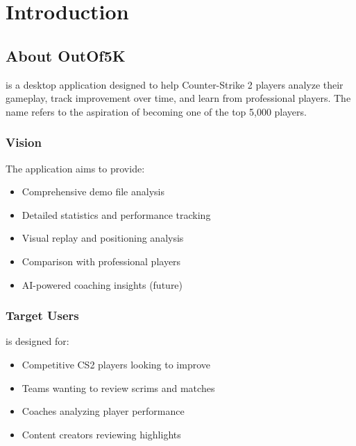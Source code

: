 \chapter{Introduction}
\label{ch:introduction}

\section{About OutOf5K}

 is a desktop application designed to help Counter-Strike 2 players analyze their gameplay, track improvement over time, and learn from professional players. The name refers to the aspiration of becoming one of the top 5,000 players.

\subsection{Vision}

The application aims to provide:

\begin{itemize}
    \item Comprehensive demo file analysis
    \item Detailed statistics and performance tracking
    \item Visual replay and positioning analysis
    \item Comparison with professional players
    \item AI-powered coaching insights (future)
\end{itemize}

\subsection{Target Users}

\outof{} is designed for:

\begin{marginfigure}
    \centering
    \caption{Primary user persona: Competitive CS2 player seeking improvement}
\end{marginfigure}

\begin{itemize}
    \item Competitive CS2 players looking to improve
    \item Teams wanting to review scrims and matches
    \item Coaches analyzing player performance
    \item Content creators reviewing highlights
\end{itemize}

